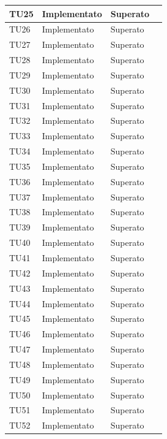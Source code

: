 \begin{longtable}{|>{\centering\arraybackslash}m{1.6cm}|>{\centering\arraybackslash}m{6.41cm}|>{\centering\arraybackslash}m{3.1cm}| c |}
	TU25 & Implementato & Superato \\ \hline		
	TU26 & Implementato & Superato \\ \hline
		\rowcolor{LightGray}
	TU27 & Implementato & Superato  \\ \hline
	TU28 & Implementato & Superato  \\ \hline
		\rowcolor{LightGray}
	TU29 & Implementato & Superato  \\ \hline
	TU30 & Implementato & Superato  \\ \hline
		\rowcolor{LightGray}
	TU31 & Implementato & Superato  \\ \hline
	TU32 & Implementato & Superato  \\ \hline
		\rowcolor{LightGray}
	TU33 & Implementato & Superato  \\ \hline
	TU34 & Implementato & Superato  \\ \hline
		\rowcolor{LightGray}
	TU35 & Implementato & Superato \\ \hline
	TU36 & Implementato & Superato \\ \hline
		\rowcolor{LightGray}
	TU37 & Implementato & Superato  \\ \hline
	TU38 & Implementato & Superato  \\ \hline
		\rowcolor{LightGray}
	TU39 & Implementato & Superato  \\ \hline
	TU40 & Implementato & Superato  \\ \hline
		\rowcolor{LightGray}
	TU41 & Implementato & Superato  \\ \hline
	TU42 & Implementato & Superato  \\ \hline
		\rowcolor{LightGray}
	TU43 & Implementato & Superato  \\ \hline
	TU44 & Implementato & Superato  \\ \hline
		\rowcolor{LightGray}
	TU45 & Implementato & Superato  \\ \hline
	TU46 & Implementato & Superato  \\ \hline
		\rowcolor{LightGray}
	TU47 & Implementato & Superato  \\ \hline
	TU48 & Implementato & Superato  \\ \hline
		\rowcolor{LightGray}
	TU49 & Implementato & Superato  \\ \hline
	TU50 & Implementato & Superato  \\ \hline
		\rowcolor{LightGray}
	TU51 & Implementato & Superato  \\ \hline
	TU52 & Implementato & Superato  \\ \hline

\end{longtable}
